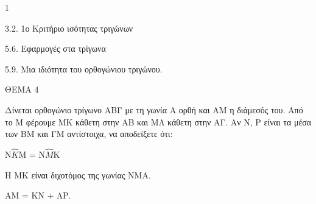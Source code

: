 \begin{ylh}{1}
    \item 3.2. 1ο Κριτήριο ισότητας τριγώνων
    \item 5.6. Εφαρμογές στα τρίγωνα
    \item 5.9. Μια ιδιότητα του ορθογώνιου τριγώνου.
\end{ylh}

ΘΕΜΑ 4

Δίνεται ορθογώνιο τρίγωνο ΑΒΓ με τη γωνία Α ορθή και ΑΜ η διάμεσός του. Από το Μ φέρουμε ΜΚ κάθετη στην ΑΒ και ΜΛ κάθετη στην ΑΓ. Αν Ν, Ρ είναι τα μέσα των ΒΜ και ΓΜ αντίστοιχα, να αποδείξετε ότι:

\begin{alist}
\item N$\widehat{K}$M = N$\widehat{M}$K 

\item Η ΜΚ είναι διχοτόμος της γωνίας ΝΜΑ. 

\item ΑΜ = ΚΝ + ΛΡ. 
\end{alist}
